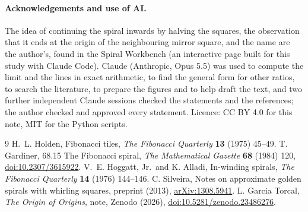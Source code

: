 \documentclass[11pt,a4paper]{article}
\theoremstyle{plain}
\theoremstyle{definition}
\theoremstyle{remark}
\begin{document}
\paragraph{Acknowledgements and use of AI.} The idea of continuing the spiral inwards by halving the squares, the observation that it ends at the origin of the neighbouring mirror square, and the name are the author's, found in the Spiral Workbench (an interactive page built for this study with Claude Code). Claude (Anthropic, Opus 5.5) was used to compute the limit and the lines in exact arithmetic, to find the general form for other ratios, to search the literature, to prepare the figures and to help draft the text, and two further independent Claude sessions checked the statements and the references; the author checked and approved every statement. Licence: CC BY 4.0 for this note, MIT for the Python scripts.

{\footnotesize\begin{thebibliography}{9}\setlength{\itemsep}{0pt}
 H.~L. Holden, Fibonacci tiles, \emph{The Fibonacci Quarterly} \textbf{13} (1975) 45--49.
 T. Gardiner, 68.15 The Fibonacci spiral, \emph{The Mathematical Gazette} \textbf{68} (1984) 120, \href{https://doi.org/10.2307/3615922}{doi:10.2307/3615922}.
 V.~E. Hoggatt, Jr.\ and K. Alladi, In-winding spirals, \emph{The Fibonacci Quarterly} \textbf{14} (1976) 144--146.
 C. Silveira, Notes on approximate golden spirals with whirling squares, preprint (2013), \href{https://arxiv.org/abs/1308.5941}{arXiv:1308.5941}.
 L. Garcia Torcal, \emph{The Origin of Origins}, note, Zenodo (2026), \href{https://doi.org/10.5281/zenodo.23486276}{doi:10.5281/zenodo.23486276}.
\end{thebibliography}}
\end{document}
